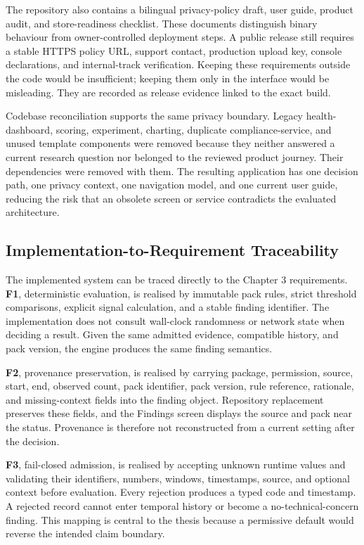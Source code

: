 The repository also contains a bilingual privacy-policy draft, user guide, product audit, and store-readiness checklist. These documents distinguish binary behaviour from owner-controlled deployment steps. A public release still requires a stable HTTPS policy URL, support contact, production upload key, console declarations, and internal-track verification. Keeping these requirements outside the code would be insufficient; keeping them only in the interface would be misleading. They are recorded as release evidence linked to the exact build.

Codebase reconciliation supports the same privacy boundary. Legacy health-dashboard, scoring, experiment, charting, duplicate compliance-service, and unused template components were removed because they neither answered a current research question nor belonged to the reviewed product journey. Their dependencies were removed with them. The resulting application has one decision path, one privacy context, one navigation model, and one current user guide, reducing the risk that an obsolete screen or service contradicts the evaluated architecture.

\subsection{Implementation-to-Requirement Traceability}

The implemented system can be traced directly to the Chapter 3 requirements. \textbf{F1}, deterministic evaluation, is realised by immutable pack rules, strict threshold comparisons, explicit signal calculation, and a stable finding identifier. The implementation does not consult wall-clock randomness or network state when deciding a result. Given the same admitted evidence, compatible history, and pack version, the engine produces the same finding semantics.

\textbf{F2}, provenance preservation, is realised by carrying package, permission, source, start, end, observed count, pack identifier, pack version, rule reference, rationale, and missing-context fields into the finding object. Repository replacement preserves these fields, and the Findings screen displays the source and pack near the status. Provenance is therefore not reconstructed from a current setting after the decision.

\textbf{F3}, fail-closed admission, is realised by accepting unknown runtime values and validating their identifiers, numbers, windows, timestamps, source, and optional context before evaluation. Every rejection produces a typed code and timestamp. A rejected record cannot enter temporal history or become a no-technical-concern finding. This mapping is central to the thesis because a permissive default would reverse the intended claim boundary.

